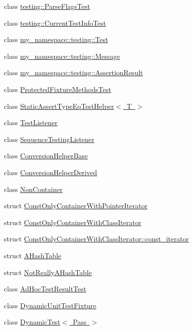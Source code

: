 \begin{DoxyCompactItemize}
class \mbox{\hyperlink{classtesting_1_1_parse_flags_test}{testing\+::\+Parse\+Flags\+Test}}
\item 
class \mbox{\hyperlink{classtesting_1_1_current_test_info_test}{testing\+::\+Current\+Test\+Info\+Test}}
\item 
class \mbox{\hyperlink{classmy__namespace_1_1testing_1_1_test}{my\+\_\+namespace\+::testing\+::\+Test}}
\item 
class \mbox{\hyperlink{classmy__namespace_1_1testing_1_1_message}{my\+\_\+namespace\+::testing\+::\+Message}}
\item 
class \mbox{\hyperlink{classmy__namespace_1_1testing_1_1_assertion_result}{my\+\_\+namespace\+::testing\+::\+Assertion\+Result}}
\item 
class \mbox{\hyperlink{class_protected_fixture_methods_test}{Protected\+Fixture\+Methods\+Test}}
\item 
class \mbox{\hyperlink{class_static_assert_type_eq_test_helper}{Static\+Assert\+Type\+Eq\+Test\+Helper$<$ T $>$}}
\item 
class \mbox{\hyperlink{class_test_listener}{Test\+Listener}}
\item 
class \mbox{\hyperlink{class_sequence_testing_listener}{Sequence\+Testing\+Listener}}
\item 
class \mbox{\hyperlink{class_conversion_helper_base}{Conversion\+Helper\+Base}}
\item 
class \mbox{\hyperlink{class_conversion_helper_derived}{Conversion\+Helper\+Derived}}
\item 
class \mbox{\hyperlink{class_non_container}{Non\+Container}}
\item 
struct \mbox{\hyperlink{struct_const_only_container_with_pointer_iterator}{Const\+Only\+Container\+With\+Pointer\+Iterator}}
\item 
struct \mbox{\hyperlink{struct_const_only_container_with_class_iterator}{Const\+Only\+Container\+With\+Class\+Iterator}}
\item 
struct \mbox{\hyperlink{struct_const_only_container_with_class_iterator_1_1const__iterator}{Const\+Only\+Container\+With\+Class\+Iterator\+::const\+\_\+iterator}}
\item 
struct \mbox{\hyperlink{struct_a_hash_table}{A\+Hash\+Table}}
\item 
struct \mbox{\hyperlink{struct_not_really_a_hash_table}{Not\+Really\+A\+Hash\+Table}}
\item 
class \mbox{\hyperlink{class_ad_hoc_test_result_test}{Ad\+Hoc\+Test\+Result\+Test}}
\item 
class \mbox{\hyperlink{class_dynamic_unit_test_fixture}{Dynamic\+Unit\+Test\+Fixture}}
\item 
class \mbox{\hyperlink{class_dynamic_test}{Dynamic\+Test$<$ Pass $>$}}
\end{DoxyCompactItemize}
